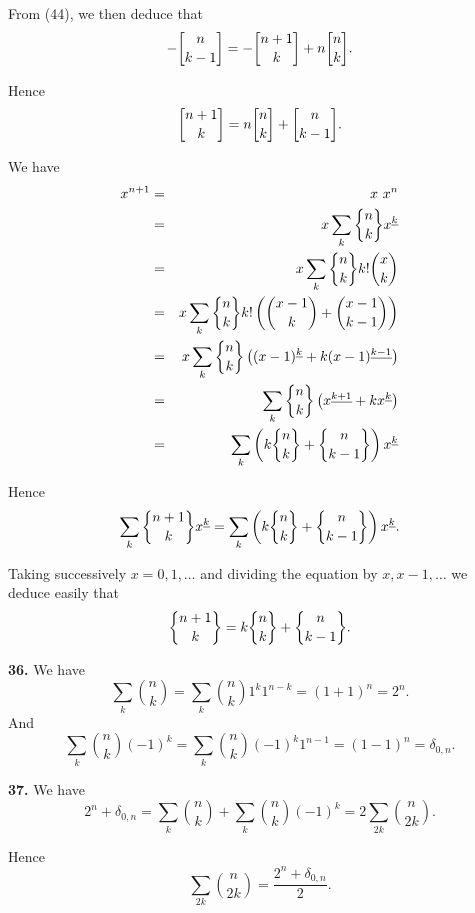 \documentclass[a4paper,12pt]{article}
\newcommand{\newpar}[1]{\bigskip \noindent \textbf{#1.}}
\newcommand{\stirlingone}[2]{{#1 \atopwithdelims[]#2}}
\newcommand{\stirlingtwo}[2]{{#1 \atopwithdelims\{\}#2}}
\begin{document}
From (44), we then deduce that
\[ - \stirlingone{n}{k-1} = - \stirlingone{n+1}{k} + n
\stirlingone{n}{k}.\]

Hence
\[ \stirlingone{n+1}{k} = n \stirlingone{n}{k} +
\stirlingone{n}{k-1}.\]

We have
\begin{eqnarray*}
  x^{n+1} &=& x\ x^n \\
  &=& x \sum_k \stirlingtwo{n}{k} x^{\underline{k}} \\
  &=& x \sum_k \stirlingtwo{n}{k} k! {x \choose k} \\
  &=& x \sum_k \stirlingtwo{n}{k} k! \left( {x-1 \choose k} + {x-1
    \choose k-1} \right) \\
  &=& x \sum_k \stirlingtwo{n}{k} \left( (x-1)^{\underline{k}} + k
  (x-1)^{\underline{k-1}} \right) \\
  &=& \sum_k \stirlingtwo{n}{k} \left( x^{\underline{k+1}} + k
  x^{\underline{k}} \right) \\
  &=& \sum_k \left(k \stirlingtwo{n}{k} + \stirlingtwo{n}{k-1}\right)
  x^{\underline{k}}
\end{eqnarray*}

Hence
\[ \sum_k \stirlingtwo{n+1}{k} x^{\underline{k}} = \sum_k \left(k
\stirlingtwo{n}{k} + \stirlingtwo{n}{k-1}\right) x^{\underline{k}}.\]

Taking successively $x = 0, 1, \ldots$ and dividing the equation by
$x, x-1, \ldots$ we deduce easily that
\[ \stirlingtwo{n+1}{k} = k \stirlingtwo{n}{k} +
\stirlingtwo{n}{k-1}.\]

\newpar{36} We have
\[ \sum_k {n \choose k} = \sum_k {n \choose k} 1^k 1^{n-k} = (1 + 1)^n
= 2^n.\]
And
\[ \sum_k {n \choose k} (-1)^k = \sum_k {n \choose k} (-1)^k 1^{n-1} =
(1-1)^n = \delta_{0,n}.\]

\newpar{37} We have
\[ 2^n + \delta_{0,n} = \sum_k {n \choose k} + \sum_k {n \choose k}
(-1)^k = 2 \sum_{2k} {n \choose 2k}.\]

Hence
\[ \sum_{2k} {n \choose 2k} = \frac{2^n + \delta_{0,n}}{2}.\]
\end{document}
